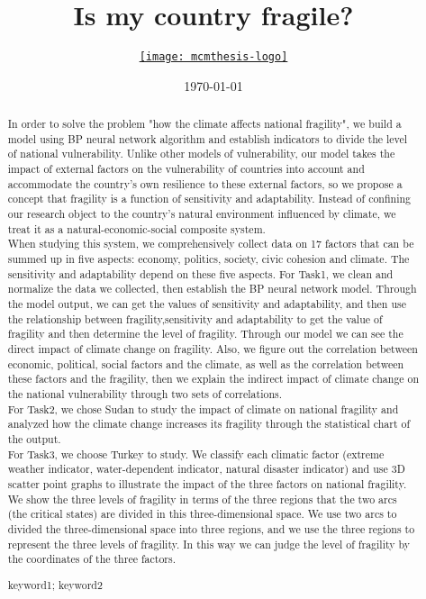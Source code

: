 \documentclass{mcmthesis}
\title{Is my country fragile?}
\author{\small \href{http://www.latexstudio.net/}
  {\texttt{[image: mcmthesis-logo]}}}
\date{\today}
\begin{document}
\begin{abstract}
  In order to solve the problem "how the climate affects national fragility", we build a model using BP neural network algorithm and establish indicators to divide the level of national vulnerability. Unlike other models of vulnerability, our model takes the impact of external factors on the vulnerability of countries into account  and accommodate the country's own resilience to these external factors, so we propose a concept that fragility is a function of sensitivity and adaptability. Instead of confining our research object to the country's natural environment influenced by climate, we treat it as a natural-economic-social composite system. \\
  When studying this system, we comprehensively collect data on 17 factors that can be summed up in five aspects: economy, politics, society, civic cohesion and climate. The sensitivity and adaptability depend on these five aspects.
  For Task1, we clean and normalize the data we collected, then establish the BP neural network model. Through the model output, we can get the values ​​of sensitivity and adaptability, and then use the relationship between fragility,sensitivity and adaptability to get the value of fragility and then determine the level of fragility. Through our model we can see the direct impact of climate change on fragility. Also, we figure out the correlation between economic, political, social factors and the climate, as well as the correlation between these factors and the fragility, then we explain the indirect impact of climate change on the national vulnerability through two sets of correlations.\\
  For Task2, we chose Sudan to study the impact of climate on national fragility and analyzed how the climate change increases its fragility through the statistical chart of the output.\\
  For Task3, we choose Turkey to study. We classify each climatic factor (extreme weather indicator, water-dependent indicator, natural disaster indicator) and use 3D scatter point graphs to illustrate the impact of the three factors on national fragility. We show the three levels of fragility in terms of the three regions that the two arcs (the critical states) are divided in this three-dimensional space. We use two arcs to divided the three-dimensional space into three regions, and we use the three regions to represent the three levels of fragility. In this way we can judge the level of fragility by the coordinates of the three factors.

\begin{keywords}
keyword1; keyword2
\end{keywords}
\end{abstract}
\maketitle
\restoregeometry
\tableofcontents
\end{document}
